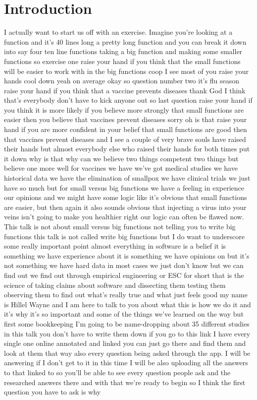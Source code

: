 \documentclass[conference, compsoc, twoside]{IEEEtran}
\begin{document}
\section{Introduction}
I actually want to start us off with an exercise. Imagine you're looking at a function and it's 40 lines long a pretty long function and you can break it down into say four ten line functions taking a big
function and making some smaller functions so exercise one raise your hand if you think that the small
functions will be easier to work with in the big functions coop I see most of you
raise your hands cool down yeah on average okay so
question number two it's flu season raise your hand if you think that a
vaccine prevents diseases thank God I think that's everybody don't
have to kick anyone out so last question
raise your hand if you think it is more
likely if you believe more strongly that
small functions are easier then you
believe that vaccines prevent diseases
sorry oh is that raise your hand if you
are more confident in your belief that
small functions are good then that vaccines prevent diseases and I see a
couple of very brave souls have raised
their hands but almost everybody else
who raised their hands for both times
put it down why is that why can we
believe two things competent two things
but believe one more well for vaccines
we have we've got medical studies we
have historical data we have the
elimination of smallpox we have clinical
trials we just have so much but for small versus big functions we have a feeling in experience our opinions and we might have some logic like it's obvious that small functions are easier, but then again it also sounds obvious that injecting a virus into your veins isn't going to make you healthier right our logic can often be flawed now.
This talk is not about small versus big functions not telling you to write big functions this talk is not called write big
functions but I do want to underscore some really important point almost everything in software is a
belief it is something we have
experience about it is something we have
opinions on but it's not something we
have hard data in most cases we just
don't know but we can find out we find
out through empirical engineering or ESC
for short that is the science of taking
claims about software and dissecting
them testing them observing them to find
out what's really true and what just
feels good my name is Hillel Wayne and I
am here to talk to you about what this
is how we do it and it's why it's so
important and some of the things we've
learned on the way but first some
bookkeeping I'm going to be
name-dropping about 35 different studies in this talk you don't have to write them down if you go to this link I have
every single one online annotated and linked you can just go there and find
them and look at them that way also every question being asked through the app.
I will be answering if I don't get to it in this time I will be also
uploading all the answers to that linked
to so you'll be able to see every
question people ask and the researched
answers there and with that we're ready
to begin so I think the first question
you have to ask is why 
\end{document}

